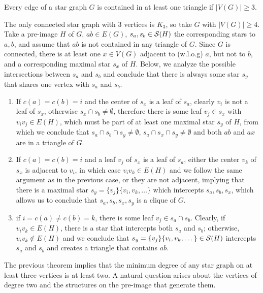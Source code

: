 \begin{theorem}
    Every edge of a star graph $G$ is contained in at least one triangle if $|V(G)| \geq 3$.
\end{theorem}

\begin{tproof}
    The only connected star graph with 3 vertices is $K_3$, so take $G$ with $|V(G)| \geq 4$.
    Take a pre-image $H$ of $G$, $ab \in E(G)$, $s_a, s_b \in \mathcal{S}(H)$ the corresponding stars to $a, b$, and assume that $ab$ is not contained in any triangle of $G$.
    Since $G$ is connected, there is at least one $x \in V(G)$ adjacent to (w.l.o.g) $a$, but not to $b$, and a corresponding maximal star $s_x$ of $H$.
    Below, we analyze the possible intersections between $s_a$ and $s_b$ and conclude that there is always some star $s_y$ that shares one vertex with $s_a$ and $s_b$.
    \begin{enumerate}
        \item If $c(a) = c(b) = i$ and the center of $s_x$ is a leaf of $s_a$, clearly $v_i$ is not a leaf of $s_x$, otherwise $s_x \cap s_b \neq \emptyset$, therefore there is some leaf $v_j \in s_x$ with $v_iv_j \in E(H)$, which must be part of at least one maximal star $s_y$ of $H$, from which we conclude that $s_a \cap s_b \cap s_y \neq \emptyset$, $s_a \cap s_x \cap s_y \neq \emptyset$ and both $ab$ and $ax$ are in a triangle of $G$.
        \item If $c(a) = c(b) = i$ and a leaf $v_j$ of $s_x$ is a leaf of $s_a$, either the center $v_k$ of $s_x$ is adjacent to $v_i$, in which case $v_iv_k \in E(H)$ and we follow the same argument as in the previous case, or they are not adjacent, implying that there is a maximal star $s_y = \{v_j\}\{v_i, v_k, \dots\}$ which intercepts $s_a, s_b, s_x$, which allows us to conclude that $s_a, s_b, s_x, s_y$ is a clique of $G$.
        \item if $i = c(a) \neq c(b) = k$, there is some leaf $v_j \in s_a \cap s_b$. Clearly, if $v_iv_k \in E(H)$, there is a star that intercepts both $s_a$ and $s_b$;
        otherwise, $v_iv_k \notin E(H)$ and we conclude that $s_y = \{v_j\}\{v_i, v_k, \dots\} \in \mathcal{S}(H)$ intercepts $s_a$ and $s_b$ and creates a triangle that contains $ab$.
    \end{enumerate}
\end{tproof}

The previous theorem implies that the minimum degree of any star graph on at least three vertices is at least two.
A natural question arises about the vertices of degree two and the structures on the pre-image that generate them.

